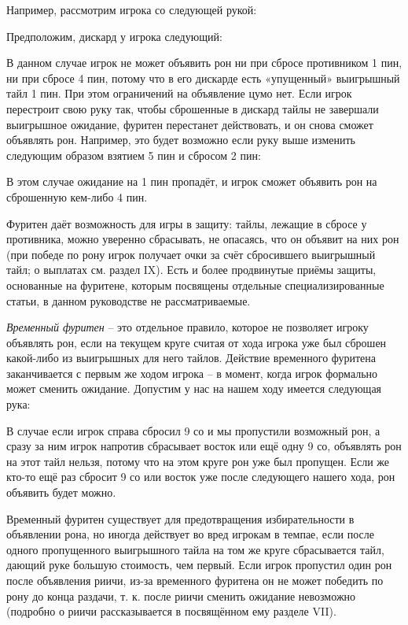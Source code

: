 Например, рассмотрим игрока со следующей рукой:


Предположим, дискард у игрока следующий:


В данном случае игрок не может объявить рон ни при сбросе противником 1 пин, ни при сбросе 4 пин, потому что в его дискарде есть «упущенный» выигрышный тайл 1 пин. При этом ограничений на объявление цумо нет. Если игрок перестроит свою руку так, чтобы сброшенные в дискард тайлы не завершали выигрышное ожидание, фуритен перестанет действовать, и он снова сможет объявлять рон. Например, это будет возможно если руку выше изменить следующим образом взятием 5 пин и сбросом 2 пин: 


В этом случае ожидание на 1 пин пропадёт, и игрок сможет объявить рон на сброшенную кем-либо 4 пин. 

Фуритен даёт возможность для игры в защиту: тайлы, лежащие в сбросе у противника, можно уверенно сбрасывать, не опасаясь, что он объявит на них рон (при победе по рону игрок получает очки за счёт сбросившего выигрышный тайл; о выплатах см. раздел IX). Есть и более продвинутые приёмы защиты, основанные на фуритене, которым посвящены отдельные специализированные статьи, в данном руководстве не рассматриваемые.

\textit{Временный фуритен} – это отдельное правило, которое не позволяет игроку объявлять рон, если на текущем круге считая от хода игрока уже был сброшен какой-либо из выигрышных для него тайлов. Действие временного фуритена заканчивается с первым же ходом игрока – в момент, когда игрок формально может сменить ожидание. Допустим у нас на нашем ходу имеется следующая рука:


В случае если игрок справа сбросил 9 со и мы пропустили возможный рон, а сразу за ним игрок напротив сбрасывает восток или ещё одну 9 со, объявлять рон на этот тайл нельзя, потому что на этом круге рон уже был пропущен. Если же кто-то ещё раз сбросит 9 со или восток уже после следующего нашего хода, рон объявить будет можно.

Временный фуритен существует для предотвращения избирательности в объявлении рона, но иногда действует во вред игрокам в темпае, если после одного пропущенного выигрышного тайла на том же круге сбрасывается тайл, дающий руке большую стоимость, чем первый. Если игрок пропустил один рон после объявления риичи, из-за временного фуритена он не может победить по рону до конца раздачи, т. к. после риичи сменить ожидание невозможно (подробно о риичи рассказывается в посвящённом ему разделе VII).

